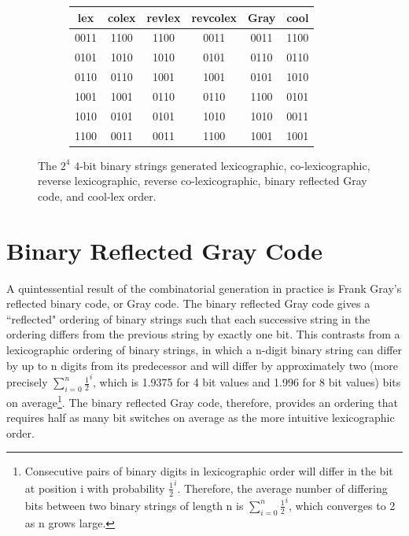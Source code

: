 \begin{figure}[]
\begin{subfigure}[]{\textwidth}
         \begin{center}
             \begin{tabular}{ |c|c|c|c||c||c| } 
                 \hline
                 lex  & colex & revlex & revcolex & Gray & cool\\
                 \hline
                 0011 & 1100 & 1100 & 0011 & 0011 & 1100 \\
                 0101 & 1010 & 1010 & 0101 & 0110 & 0110 \\
                 0110 & 0110 & 1001 & 1001 & 0101 & 1010 \\
                 1001 & 1001 & 0110 & 0110 & 1100 & 0101 \\
                 1010 & 0101 & 0101 & 1010 & 1010 & 0011 \\
                 1100 & 0011 & 0011 & 1100 & 1001 & 1001 \\
                 \hline
             \end{tabular}
         \end{center}
         \label{fig:2c2}
     \end{subfigure}
     \begin{center}

     \end{center}
     \caption{The $2^4$ $4$-bit binary strings generated lexicographic, co-lexicographic, reverse lexicographic, reverse co-lexicographic, binary reflected Gray code, and cool-lex order.}
     \label{fig:bintable}
 \end{figure}


\section{Binary Reflected Gray Code} \label{sec:BRGC}

A quintessential result of the combinatorial generation in practice is Frank Gray's reflected binary code, or Gray code. The binary reflected Gray code gives a ``reflected" ordering of binary strings such that each successive string in the ordering differs from the previous string by exactly one bit. This contrasts from a lexicographic ordering of binary strings, in which a n-digit binary string can differ by up to n digits from its predecessor and will differ by approximately two (more precisely $\sum_{i=0}^n\frac{1}{2}^i$, which is 1.9375 for 4 bit values and 1.996 for 8 bit values) bits on average\footnote{Consecutive pairs of binary digits in lexicographic order will differ in the bit at position i with probability $\frac{1}{2}^i$.  Therefore, the average number of differing bits between two binary strings of length n is $\sum_{i=0}^n\frac{1}{2}^i$, which converges to 2 as n grows large.}. The binary reflected Gray code, therefore, provides an ordering that requires half as many bit switches on average as the more intuitive lexicographic order. 

